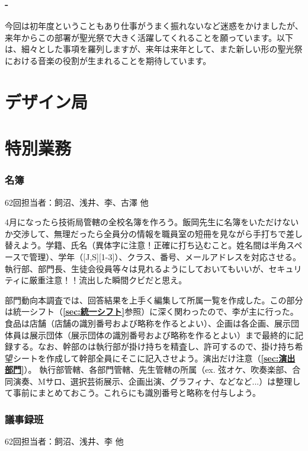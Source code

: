 \documentclass[dvipdfmx,jb5]{jarticle}
\begin{document}
\section{-}
今回は初年度ということもあり仕事がうまく振れないなど迷惑をかけましたが、来年からこの部署が聖光祭で大きく活躍してくれることを願っています。以下は、細々とした事項を羅列しますが、来年は来年として、また新しい形の聖光祭における音楽の役割が生まれることを期待しています。


 \part{デザイン局}
 \part{特別業務}
 \section{名簿}\label{sec:名簿}
62回担当者：飼沼、浅井、李、古澤 他\vspace{3mm}

4月になったら技術局管轄の全校名簿を作ろう。飯岡先生に名簿をいただけないか交渉して、無理だったら全員分の情報を職員室の短冊を見ながら手打ちで差し替えよう。学籍、氏名（異体字に注意！正確に打ち込むこと。姓名間は半角スペースで管理）、学年（[J,S][1-3]）、クラス、番号、メールアドレスを対応させる。執行部、部門長、生徒会役員等々は見れるようにしておいてもいいが、セキュリティに厳重注意！！流出した瞬間クビだと思え。

部門動向本調査では、回答結果を上手く編集して所属一覧を作成した。この部分は統一シフト（{\bf\ref{sec:統一シフト}}参照）に深く関わったので、李が主に行った。食品は店舗（店舗の識別番号および略称を作るとよい）、企画は各企画、展示団体員は展示団体（展示団体の識別番号および略称を作るとよい）まで最終的に記録する。なお、幹部のは執行部が掛け持ちを精査し、許可するので、掛け持ち希望シートを作成して幹部全員にそこに記入させよう。演出だけ注意（{\bf\ref{sec:演出部門}}）。
執行部管轄、各部門管轄、先生管轄の所属（ex. 弦オケ、吹奏楽部、合同演奏、Mサロ、選択芸術展示、企画出演、グラフィナ、などなど...）は整理して事前にまとめておこう。これらにも識別番号と略称を付与しよう。




 \section{議事録班}\label{sec:議事録班}
62回担当者：飼沼、浅井、李 他
\end{document}
